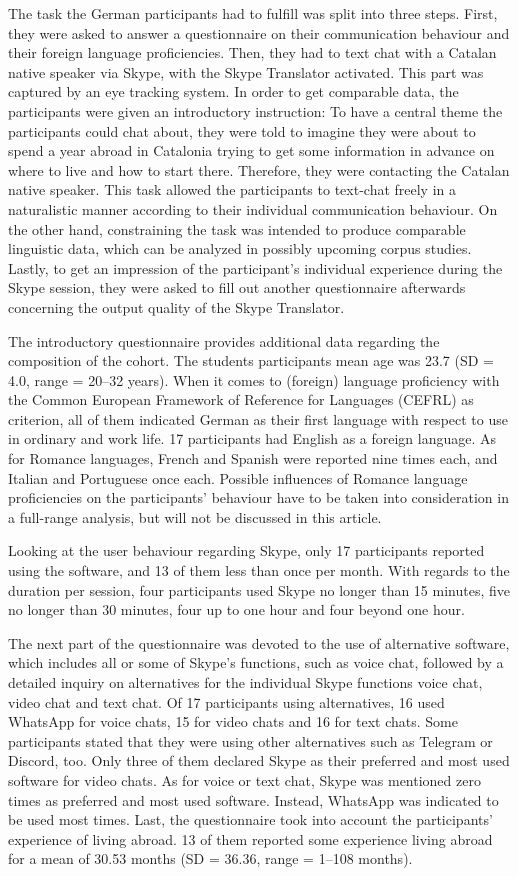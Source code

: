 \documentclass[output=paper,colorlinks,citecolor=brown]{langscibook}
\begin{document}
The task the German participants had to fulfill was split into three steps. First, they were asked to answer a questionnaire on their communication behaviour and their foreign language proficiencies. Then, they had to text chat with a Catalan native speaker via Skype, with the Skype Translator activated. This part was captured by an eye tracking system. In order to get comparable data, the participants were given an introductory instruction: To have a central theme the participants could chat about, they were told to imagine they were about to spend a year abroad in Catalonia trying to get some information in advance on where to live and how to start there. Therefore, they were contacting the Catalan native speaker. This task allowed the participants to text-chat freely in a naturalistic manner according to their individual communication behaviour. On the other hand, constraining the task was intended to produce comparable linguistic data, which can be analyzed in possibly upcoming corpus studies. Lastly, to get an impression of the participant's individual experience during the Skype session, they were asked to fill out another questionnaire afterwards concerning the output quality of the Skype Translator.

The introductory questionnaire provides additional data regarding the composition of the cohort. The students participants mean age was 23.7 (SD = 4.0, range = 20--32 years). When it comes to (foreign) language proficiency with the Common European Framework of Reference for Languages (CEFRL) as criterion, all of them indicated German as their first language with respect to use in ordinary and work life. 17 participants had English as a foreign language. As for Romance languages, French and Spanish were reported nine times each, and Italian and Portuguese once each. Possible influences of Romance language proficiencies on the participants' behaviour have to be taken into consideration in a full-range analysis, but will not be discussed in this article.

Looking at the user behaviour regarding Skype, only 17 participants reported using the software, and 13 of them less than once per month. With regards to the duration per session, four participants used Skype no longer than 15 minutes, five no longer than 30 minutes, four up to one hour and four beyond one hour.

The next part of the questionnaire was devoted to the use of alternative software, which includes all or some of Skype's functions, such as voice chat, followed by a detailed inquiry on alternatives for the individual Skype functions voice chat, video chat and text chat. Of 17 participants using alternatives, 16 used WhatsApp for voice chats, 15 for video chats and 16 for text chats. Some participants stated that they were using other alternatives such as Telegram or Discord, too. Only three of them declared Skype as their preferred and most used software for video chats. As for voice or text chat, Skype was mentioned zero times as preferred and most used software. Instead, WhatsApp was indicated to be used most times. Last, the questionnaire took into account the participants' experience of living abroad. 13 of them reported some experience living abroad for a mean of 30.53 months (SD =  36.36, range = 1--108 months).
\end{document}
